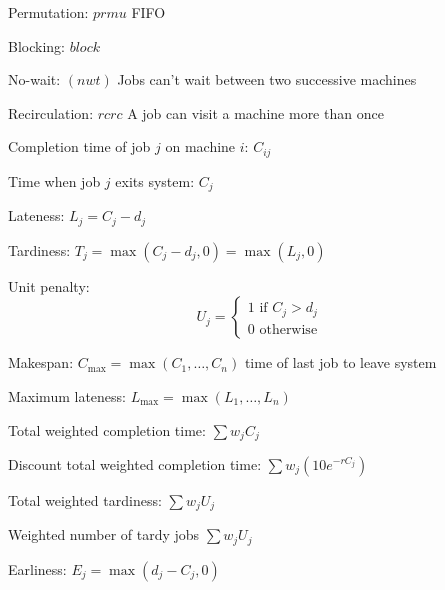 \documentclass[12pt]{article}
\theoremstyle{definition}
\newlength\mystoreparindent
\newenvironment{myparindent}[1]{%
	\setlength{\mystoreparindent}{\the\parindent}
	\setlength{\parindent}{#1}
}{%
	\setlength{\parindent}{\mystoreparindent}
}
\numberwithin{equation}{section}
\begin{document}
\begin{myparindent}{0pt}
	Permutation: $prmu$ FIFO
	
	Blocking: $block$
	
	No-wait: $(nwt)$ Jobs can't wait between two successive machines 
	
	Recirculation: $rcrc$ A job can visit a machine more than once
	
	Completion time of job $j$ on machine $i$: $C_{ij}$
	
	Time when job $j$ exits system: $C_j$
	
	Lateness: $L_j = C _j - d_j$
	
	Tardiness: $T_j = \max(C_j - d_j,0) = \max(L_j,0)$
	
	Unit penalty: 
	\begin{equation*}
	U_j = \begin{cases}
	1 \text{ if } C_j > d_j \\
	0 \text{ otherwise}
	\end{cases}
	\end{equation*}
	
	Makespan: $C_{\max} = \max(C_1,\ldots,C_n)$ time of last job to leave system
	
	Maximum lateness: $L_{\max} = \max(L_1,\ldots,L_n)$
	
	Total weighted completion time: $\sum w_jC_j$
	
	Discount total weighted completion time: $\sum w_j(10e^{-rC_j})$
	
	Total weighted tardiness: $\sum w_jU_j$
	
	Weighted number of tardy jobs $\sum w_j U_j$
	
	Earliness: $E_j = \max(d_j - C_j, 0)$
\end{myparindent}
\end{document}
